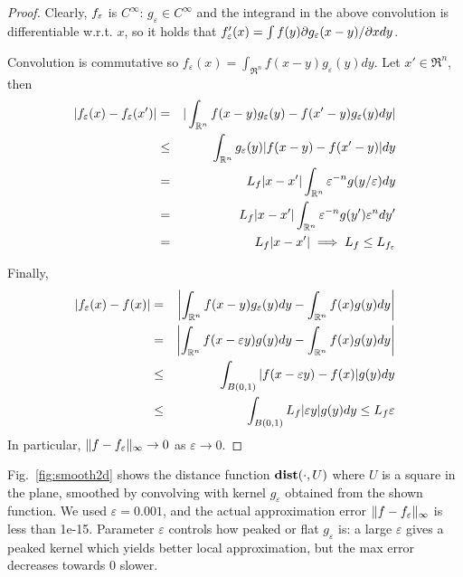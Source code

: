 \begin{proof}
	Clearly, $f_\varepsilon$ is $C^\infty$: $g_\varepsilon \in C^\infty$ and the integrand in the above convolution is differentiable w.r.t. $x$, so it holds that $f_\varepsilon'(x) = \int{f(y)\partial g_\varepsilon(x-y)/\partial x dy}$.
	
	Convolution is commutative so $f_\varepsilon(x) = \int_{\Re^n}f(x-y)g_\varepsilon(y)dy$.
	Let $x' \in \Re^n$, then 
	\begin{eqnarray*}
	|f_\varepsilon(x)-f_\varepsilon(x')| &=& |\int_{\mathbb{R}^n} f(x-y)g_\varepsilon(y) - f(x'-y)g_\varepsilon(y) dy|
	\\
	&\leq & \int_{\mathbb{R}^n} g_\varepsilon(y)|f(x-y) - f(x'-y)| dy
	\\
	& = & L_f|x-x'| \int_{\mathbb{R}^n} \varepsilon^{-n} g(y/\varepsilon) dy
	\\
	&= &L_f|x-x'| \int_{\mathbb{R}^n} \varepsilon^{-n} g(y') \varepsilon^ndy'
	\\
	&=& L_f|x-x'| \implies L_f \leq L_{f_\varepsilon}
	\end{eqnarray*}
	
	Finally, 
	\begin{eqnarray*}
	|f_\varepsilon(x)-f(x)| &=& \left|\int_{\mathbb{R}^n}f(x-y)g_\varepsilon(y)dy - \int_{\mathbb{R}^n}f(x)g(y)dy\right|
	\\
	&=& \left|\int_{\mathbb{R}^n}f(x-\varepsilon y)g(y)dy - \int_{\mathbb{R}^n}f(x)g(y)dy\right|
	\\
	&\leq& \int_{B(0,1)}|f(x- \varepsilon y) - f(x)|g(y)dy	
	\\
	&\leq & \int_{B(0,1)}L_f | \varepsilon y| g(y)dy \leq L_f \varepsilon
	\end{eqnarray*}
	In particular, $\|f-f_\varepsilon\|_\infty \rightarrow 0$ as $\varepsilon \rightarrow 0$.
\end{proof}
Fig.~\ref{fig:smooth2d} shows the distance function $\mathbf{dist}(\cdot,U)$ where $U$ is a square in the plane, smoothed by convolving with kernel $g_{\varepsilon}$ obtained from the shown function. 
We used $\varepsilon = 0.001$, and the actual approximation error $\|f-f_\varepsilon\|_\infty$ is less than 1e-15.
Parameter $\varepsilon$ controls how peaked or flat $g_\varepsilon$ is: a large $\varepsilon$ gives a peaked kernel which yields better local approximation, but the max error decreases towards 0 slower.



